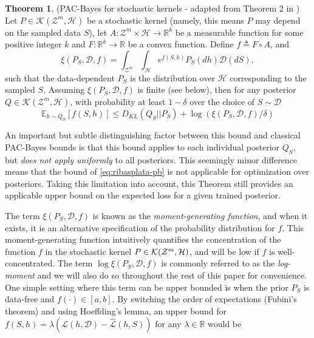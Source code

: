 \documentclass[letterpaper]{article} %
\theoremstyle{definition}
\newtheorem{theorem}{Theorem}[section]
\newcommand{\Expect}[2]{\mathbb{E}_{#1}\left [#2 \right ]}
\begin{document}
\begin{theorem} (PAC-Bayes for stochastic kernels - adapted from Theorem 2 in \citet{Rivasplata2020}) \label{thm:rivasplata-pb}
	Let $P\in \mathcal{K}(\mathcal{Z}^m, \mathcal{H})$ be a stochastic kernel (namely, this means $P$ may depend on the sampled data $S$), let $A: \mathcal{Z}^m\times \mathcal{H}\rightarrow \mathbb{R}^k$ be a measurable function for some positive integer $k$ and $F:\mathbb{R}^k\rightarrow \mathbb{R}$ be a convex function.
	Define $f\triangleq F\circ A$, and
	$$
	\xi(P_S, \mathcal{D}, f)=\int_{\mathcal{Z}^m}\int_{\mathcal{H}}e^{f(S, h)}P_S(dh)\mathcal{D}(dS),
	$$
	such that the data-dependent $P_S$ is the distribution over $\mathcal{H}$ corresponding to the sampled $S$. Assuming $\xi(P_S, \mathcal{D}, f)$ is finite (see below), then for any posterior $Q\in \mathcal{K}(\mathcal{Z}^m, \mathcal{H})$, with probability at least $1-\delta$ over the choice of $S\sim \mathcal{D}$
	\begin{equation} \label{eq:ribasplata-pb}
	\Expect{h\sim Q_S}{f(S, h)} \leq D_{KL}(Q_S||P_S)+\log\left (\xi(P_S, \mathcal{D}, f)/\delta\right )
	\end{equation}
\end{theorem}

An important but subtle distinguishing factor between this bound and classical PAC-Bayes bounds is that this bound applies to each individual posterior $Q_S$, but \emph{does not apply uniformly} to all posteriors. This seemingly minor difference means that the bound of \eqref{eq:ribasplata-pb} is not applicable for optimization over posteriors. Taking this limitation into account, this Theorem still provides an applicable upper bound on the expected loss for a given trained posterior. 

The term $\xi(P_S, \mathcal{D}, f)$ is known as the \emph{moment-generating function}, and when it exists, it is an alternative specification of the probability distribution for $f$.
This moment-generating function intuitively quantifies the concentration of the function $f$ in the stochastic kernel $P\in{\cal K}({\cal Z}^m,{\cal H})$, and will be low if $f$ is well-concentrated.
The term $\log\xi(P_S, \mathcal{D}, f)$ is commonly referred to as the \emph{log-moment} and we will also do so throughout the rest of this paper for convenience. 
One simple setting where this term can be upper bounded is when the prior $P_S$ is data-free and $f(\cdot)\in[a,b]$. By switching the order of expectations (Fubini's theorem) and using Hoeffding's lemma, an upper bound for $f(S,h)=\lambda(\mathcal{L}(h,\mathcal{D})-\hat{\mathcal{L}}(h, S))$ for any $\lambda\in \mathbb{R}$ would be
\end{document}
